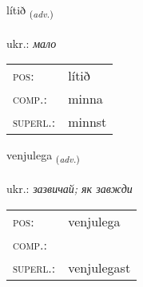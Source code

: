 \documentclass[frontgrid, backgrid]{flacards}\usepackage[]{graphicx}\usepackage[]{xcolor}
\begin{document}
\renewcommand{\flhead}{\vskip5pt \fboxsep=0pt {\small\bfseries\footnotesize Atviksorð | прислівник}}
\renewcommand{\fcfoot}{\vskip5pt \fboxsep=0pt \hspace{2pt}{\small\bfseries\footnotesize 2K}}

\renewcommand{\blhead}{\vskip5pt {\small\bfseries\footnotesize Atviksorð | прислівник }}
\renewcommand{\bcfoot}{\vskip5pt \hspace{2pt}{\small\bfseries\footnotesize 2K}}


{lítið \small{\textsubscript{(\textit{adv.})}} \\[1ex] %
\textphonetic{[liːtɪð]} \\
ukr.: \emph{мало} \\  [2ex]
\renewcommand*{\arraystretch}{0.8}
\begin{tabular}{ll}
\textsc{pos}: & lítið \\ 
\textsc{comp.}: & minna \\ 
\textsc{superl.}: & minnst \\
\end{tabular}
}

\renewcommand{\flhead}{\vskip5pt \fboxsep=0pt {\small\bfseries\footnotesize Atviksorð | прислівник}}
\renewcommand{\fcfoot}{\vskip5pt \fboxsep=0pt \hspace{2pt}{\small\bfseries\footnotesize 2K}}

\renewcommand{\blhead}{\vskip5pt {\small\bfseries\footnotesize Atviksorð | прислівник }}
\renewcommand{\bcfoot}{\vskip5pt \hspace{2pt}{\small\bfseries\footnotesize 2K}}


{venjulega \small{\textsubscript{(\textit{adv.})}} \\[1ex] %
\textphonetic{[vɛnjʏlɛɣa]} \\
ukr.: \emph{зазвичай; як завжди} \\  [2ex]
\renewcommand*{\arraystretch}{0.8}
\begin{tabular}{ll}
\textsc{pos}: & venjulega \\ 
\textsc{comp.}: &  \\ 
\textsc{superl.}: & venjulegast \\
\end{tabular}
}
\end{document}
